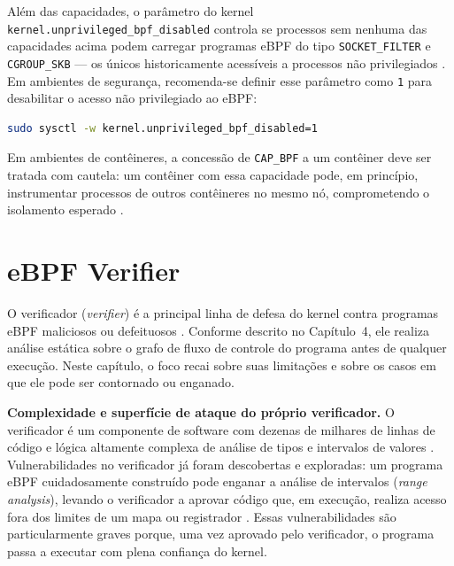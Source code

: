 Além das capacidades, o parâmetro do kernel \texttt{kernel.unprivileged\_bpf\_disabled}
controla se processos sem nenhuma das capacidades acima podem carregar programas
eBPF do tipo \texttt{SOCKET\_FILTER} e \texttt{CGROUP\_SKB} — os únicos
historicamente acessíveis a processos não privilegiados \cite{linuxkernel2024}.
Em ambientes de segurança, recomenda-se definir esse parâmetro como \texttt{1}
para desabilitar o acesso não privilegiado ao eBPF:

\begin{lstlisting}[language=bash, caption={Desabilitação de eBPF não privilegiado via sysctl.}]
sudo sysctl -w kernel.unprivileged_bpf_disabled=1
\end{lstlisting}

Em ambientes de contêineres, a concessão de \texttt{CAP\_BPF} a um contêiner
deve ser tratada com cautela: um contêiner com essa capacidade pode, em princípio,
instrumentar processos de outros contêineres no mesmo nó, comprometendo o
isolamento esperado \cite{gregg2020}.

\section{eBPF Verifier}

O verificador (\textit{verifier}) é a principal linha de defesa do kernel contra
programas eBPF maliciosos ou defeituosos \cite{linuxkernel2024}.
Conforme descrito no Capítulo~4, ele realiza análise estática sobre o grafo de
fluxo de controle do programa antes de qualquer execução.
Neste capítulo, o foco recai sobre suas limitações e sobre os casos em que ele
pode ser contornado ou enganado.

\textbf{Complexidade e superfície de ataque do próprio verificador.}
O verificador é um componente de software com dezenas de milhares de linhas de
código e lógica altamente complexa de análise de tipos e intervalos de valores
\cite{linuxkernel2024}.
Vulnerabilidades no verificador já foram descobertas e exploradas: um programa
eBPF cuidadosamente construído pode enganar a análise de intervalos (\textit{range
analysis}), levando o verificador a aprovar código que, em execução, realiza
acesso fora dos limites de um mapa ou registrador \cite{gregg2019}.
Essas vulnerabilidades são particularmente graves porque, uma vez aprovado pelo
verificador, o programa passa a executar com plena confiança do kernel.

